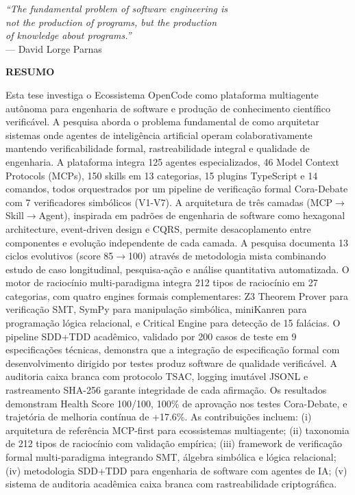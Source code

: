 \documentclass[12pt,a4paper,sumario=tradicional]{abntex2}
\begin{document}
\newpage
\thispagestyle{empty}
\vspace*{8cm}
\begin{flushright}
\textit{``The fundamental problem of software engineering is}\\
\textit{not the production of programs, but the production}\\
\textit{of knowledge about programs.''}\\[0.5cm]
--- David Lorge Parnas
\end{flushright}

\newpage
\begin{center}
\textbf{RESUMO}
\end{center}

Esta tese investiga o Ecossistema OpenCode como plataforma multiagente autônoma para engenharia de software e produção de conhecimento científico verificável. A pesquisa aborda o problema fundamental de como arquitetar sistemas onde agentes de inteligência artificial operam colaborativamente mantendo verificabilidade formal, rastreabilidade integral e qualidade de engenharia. A plataforma integra 125 agentes especializados, 46 Model Context Protocols (MCPs), 150 skills em 13 categorias, 15 plugins TypeScript e 14 comandos, todos orquestrados por um pipeline de verificação formal Cora-Debate com 7 verificadores simbólicos (V1-V7). A arquitetura de três camadas (MCP$\rightarrow$Skill$\rightarrow$Agent), inspirada em padrões de engenharia de software como hexagonal architecture, event-driven design e CQRS, permite desacoplamento entre componentes e evolução independente de cada camada. A pesquisa documenta 13 ciclos evolutivos (score 85$\rightarrow$100) através de metodologia mista combinando estudo de caso longitudinal, pesquisa-ação e análise quantitativa automatizada. O motor de raciocínio multi-paradigma integra 212 tipos de raciocínio em 27 categorias, com quatro engines formais complementares: Z3 Theorem Prover para verificação SMT, SymPy para manipulação simbólica, miniKanren para programação lógica relacional, e Critical Engine para detecção de 15 falácias. O pipeline SDD+TDD acadêmico, validado por 200 casos de teste em 9 especificações técnicas, demonstra que a integração de especificação formal com desenvolvimento dirigido por testes produz software de qualidade verificável. A auditoria caixa branca com protocolo TSAC, logging imutável JSONL e rastreamento SHA-256 garante integridade de cada afirmação. Os resultados demonstram Health Score 100/100, 100\% de aprovação nos testes Cora-Debate, e trajetória de melhoria contínua de +17.6\%. As contribuições incluem: (i) arquitetura de referência MCP-first para ecossistemas multiagente; (ii) taxonomia de 212 tipos de raciocínio com validação empírica; (iii) framework de verificação formal multi-paradigma integrando SMT, álgebra simbólica e lógica relacional; (iv) metodologia SDD+TDD para engenharia de software com agentes de IA; (v) sistema de auditoria acadêmica caixa branca com rastreabilidade criptográfica.
\end{document}
